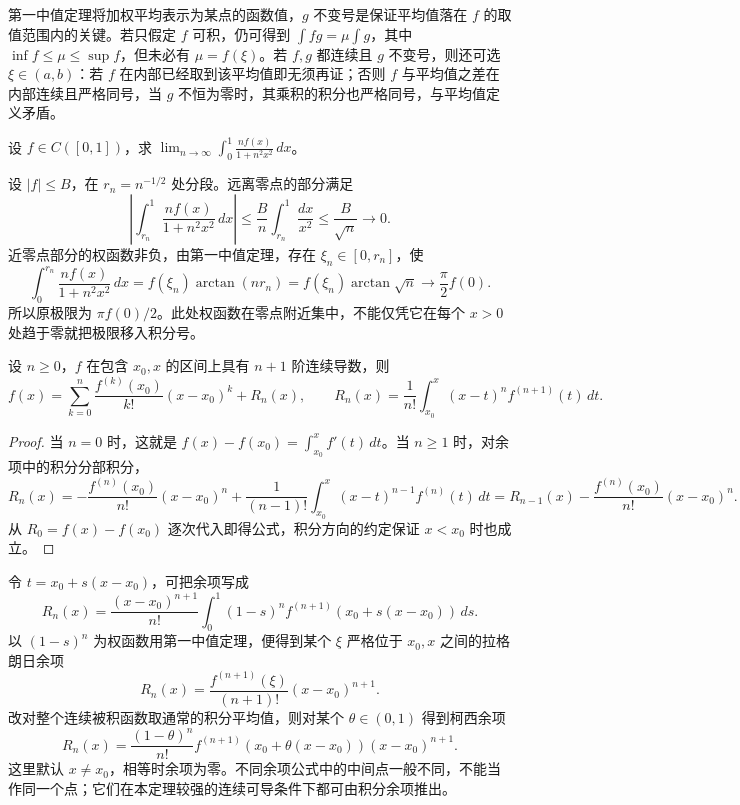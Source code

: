 第一中值定理将加权平均表示为某点的函数值，$g$ 不变号是保证平均值落在 $f$ 的取值范围内的关键。若只假定 $f$ 可积，仍可得到 $\int fg=\mu\int g$，其中 $\inf f\leq\mu\leq\sup f$，但未必有 $\mu=f(\xi)$。若 $f,g$ 都连续且 $g$ 不变号，则还可选 $\xi\in(a,b)$：若 $f$ 在内部已经取到该平均值即无须再证；否则 $f$ 与平均值之差在内部连续且严格同号，当 $g$ 不恒为零时，其乘积的积分也严格同号，与平均值定义矛盾。

\begin{example}
\label{ex:concentrating-integral-kernel}
设 $f\in C([0,1])$，求 $\displaystyle\lim_{n\to\infty}\int_0^1\frac{nf(x)}{1+n^2x^2}\,dx$。
\end{example}
\begin{solve}
设 $|f|\leq B$，在 $r_n=n^{-1/2}$ 处分段。远离零点的部分满足
\[
    \left|\int_{r_n}^1\frac{nf(x)}{1+n^2x^2}\,dx\right|
    \leq\frac Bn\int_{r_n}^1\frac{dx}{x^2}
    \leq\frac B{\sqrt n}\longrightarrow0.
\]
近零点部分的权函数非负，由第一中值定理，存在 $\xi_n\in[0,r_n]$，使
\[
    \int_0^{r_n}\frac{nf(x)}{1+n^2x^2}\,dx
    =f(\xi_n)\arctan(nr_n)
    =f(\xi_n)\arctan\sqrt n
    \longrightarrow\frac{\pi}{2}f(0).
\]
所以原极限为 $\pi f(0)/2$。此处权函数在零点附近集中，不能仅凭它在每个 $x>0$ 处趋于零就把极限移入积分号。
\end{solve}

\begin{theorem}[带积分余项的泰勒公式]
\label{thm:taylor-integral-remainder}
设 $n\geq0$，$f$ 在包含 $x_0,x$ 的区间上具有 $n+1$ 阶连续导数，则
\begin{equation}
    f(x)=\sum_{k=0}^n\frac{f^{(k)}(x_0)}{k!}(x-x_0)^k+R_n(x),
    \qquad
    R_n(x)=\frac1{n!}\int_{x_0}^x(x-t)^n f^{(n+1)}(t)\,dt.
    \label{eq:taylor-integral-remainder}
\end{equation}
\end{theorem}
\begin{proof}
当 $n=0$ 时，这就是 $f(x)-f(x_0)=\int_{x_0}^x f'(t)\,dt$。当 $n\geq1$ 时，对余项中的积分分部积分，
\[
    R_n(x)
    =-\frac{f^{(n)}(x_0)}{n!}(x-x_0)^n
      +\frac1{(n-1)!}\int_{x_0}^x(x-t)^{n-1}f^{(n)}(t)\,dt
    =R_{n-1}(x)-\frac{f^{(n)}(x_0)}{n!}(x-x_0)^n.
\]
从 $R_0=f(x)-f(x_0)$ 逐次代入即得公式，积分方向的约定保证 $x<x_0$ 时也成立。
\end{proof}

令 $t=x_0+s(x-x_0)$，可把余项写成
\[
    R_n(x)=\frac{(x-x_0)^{n+1}}{n!}
    \int_0^1(1-s)^n f^{(n+1)}(x_0+s(x-x_0))\,ds.
\]
以 $(1-s)^n$ 为权函数用第一中值定理，便得到某个 $\xi$ 严格位于 $x_0,x$ 之间的拉格朗日余项
\[
    R_n(x)=\frac{f^{(n+1)}(\xi)}{(n+1)!}(x-x_0)^{n+1}.
\]
改对整个连续被积函数取通常的积分平均值，则对某个 $\theta\in(0,1)$ 得到柯西余项
\[
    R_n(x)=\frac{(1-\theta)^n}{n!}
    f^{(n+1)}(x_0+\theta(x-x_0))(x-x_0)^{n+1}.
\]
这里默认 $x\neq x_0$，相等时余项为零。不同余项公式中的中间点一般不同，不能当作同一个点；它们在本定理较强的连续可导条件下都可由积分余项推出。

